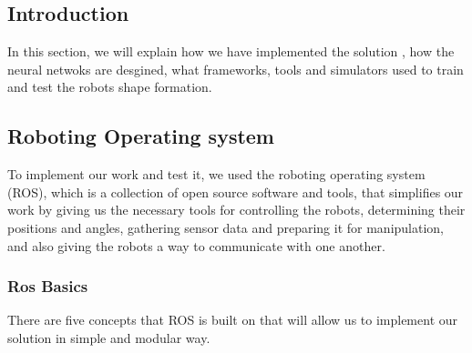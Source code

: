 \documentclass[12pt]{extarticle}
\begin{document}
\pagebreak




\subsection{Introduction}
In this section, we will explain how we have implemented the solution , how the neural netwoks are desgined, what frameworks, tools and simulators used to train and test the robots shape formation. 












\subsection{Roboting Operating system}
To implement our work and test it, we used the roboting operating system (ROS), which is  a collection of open source software and tools, that 
 simplifies our work by giving us the necessary tools for controlling the robots, determining their positions and angles, gathering sensor data and preparing it for manipulation, and also giving the robots a way to communicate with one another.

\subsubsection{Ros Basics}
There are five concepts that ROS is built on that will allow us to implement our solution in  simple and modular way.


 
\end{document}

